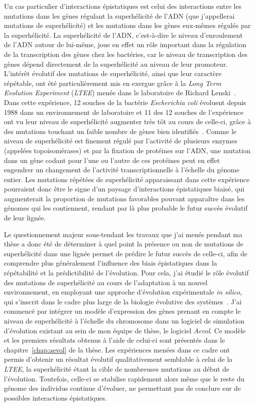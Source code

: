 Un cas particulier d'interactions épistatiques est celui des interactions entre les mutations dans les gènes régulant la superhélicité de l'ADN (que j'appellerai mutations de superhélicité) et les mutations dans les gènes eux-mêmes régulés par la superhélicité.
La superhélicité de l'ADN, c'est-à-dire le niveau d'enroulement de l'ADN autour de lui-même, joue en effet un rôle important dans la régulation de la transcription des gènes chez les bactéries, car le niveau de transcription des gènes dépend directement de la superhélicité au niveau de leur promoteur.
L'intérêt évolutif des mutations de superhélicité, ainsi que leur caractère répétable, ont été particulièrement mis en exergue grâce à la \emph{Long Term Evolution Experiment} (\emph{LTEE}) menée dans le laboratoire de Richard Lenski~\citep{lenski1991}.
Dans cette expérience, 12 souches de la bactérie \emph{Escherichia coli} évoluent depuis 1988 dans un environnement de laboratoire et 11 des 12 souches de l'expérience ont vu leur niveau de superhélicité augmenter très tôt au cours de celle-ci, grâce à des mutations touchant un faible nombre de gènes bien identifiés~\citep{crozat2010}.
Comme le niveau de superhélicité est finement régulé par l'activité de plusieurs enzymes (appelées topoisomérases) et par la fixation de protéines sur l'ADN, une mutation dans un gène codant pour l'une ou l'autre de ces protéines peut en effet engendrer un changement de l'activité transcriptionnelle à l'échelle du génome entier.
Les mutations répétées de superhélicité apparaissant dans cette expérience pourraient donc être le signe d'un paysage d'interactions épistatiques biaisé, qui augmenterait la proportion de mutations favorables pouvant apparaître dans les génomes qui les contiennent, rendant par là plus probable le futur succès évolutif de leur lignée.

Le questionnement majeur sous-tendant les travaux que j'ai menés pendant ma thèse a donc été de déterminer à quel point la présence ou non de mutations de superhélicité dans une lignée permet de prédire le futur succès de celle-ci, afin de comprendre plus généralement l'influence des biais épistatiques dans la répétabilité et la prédictibilité de l'évolution.
Pour cela, j'ai étudié le rôle évolutif des mutations de superhélicité au cours de l'adaptation à un nouvel environnement, en employant une approche d'évolution expérimentale \emph{in silico}, qui s'inscrit dans le cadre plus large de la biologie évolutive des systèmes~\citep{beslon2021}.
J'ai commencé par intégrer un modèle d'expression des gènes prenant en compte le niveau de superhélicité à l'échelle du chromosome dans un logiciel de simulation d'évolution existant au sein de mon équipe de thèse, le logiciel \emph{Aevol}.
Ce modèle et les premiers résultats obtenus à l'aide de celui-ci sont présentés dans le chapitre~\ref{chap:aevol} de la thèse.
Les expériences menées dans ce cadre ont permis d'obtenir un résultat évolutif qualitativement semblable à celui de la \emph{LTEE}, la superhélicité étant la cible de nombreuses mutations au début de l'évolution.
Toutefois, celle-ci se stabilise rapidement alors même que le reste du génome des individus continue d'évoluer, ne permettant pas de conclure sur de possibles interactions épistatiques.

